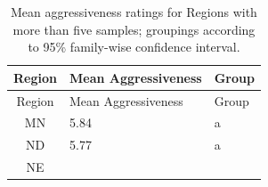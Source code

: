 \begin{longtable}[]{@{}cll@{}}
\caption{\label{tab:region-aggressiveness} Mean aggressiveness ratings for
Regions with more than five samples; groupings according to 95\%
family-wise confidence interval.}\tabularnewline
\toprule
\begin{minipage}[b]{0.14\columnwidth}\centering\strut
Region\strut
\end{minipage} & \begin{minipage}[b]{0.25\columnwidth}\raggedright\strut
Mean Aggressiveness\strut
\end{minipage} & \begin{minipage}[b]{0.08\columnwidth}\raggedright\strut
Group\strut
\end{minipage}\tabularnewline
\midrule
\endfirsthead
\toprule
\begin{minipage}[b]{0.14\columnwidth}\centering\strut
Region\strut
\end{minipage} & \begin{minipage}[b]{0.25\columnwidth}\raggedright\strut
Mean Aggressiveness\strut
\end{minipage} & \begin{minipage}[b]{0.08\columnwidth}\raggedright\strut
Group\strut
\end{minipage}\tabularnewline
\midrule
\endhead
\begin{minipage}[t]{0.14\columnwidth}\centering\strut
MN\strut
\end{minipage} & \begin{minipage}[t]{0.25\columnwidth}\raggedright\strut
5.84\strut
\end{minipage} & \begin{minipage}[t]{0.08\columnwidth}\raggedright\strut
a\strut
\end{minipage}\tabularnewline
\begin{minipage}[t]{0.14\columnwidth}\centering\strut
ND\strut
\end{minipage} & \begin{minipage}[t]{0.25\columnwidth}\raggedright\strut
5.77\strut
\end{minipage} & \begin{minipage}[t]{0.08\columnwidth}\raggedright\strut
a\strut
\end{minipage}\tabularnewline
\begin{minipage}[t]{0.14\columnwidth}\centering\strut
NE\strut
\end{minipage} & \begin{minipage}[t]{0.25\columnwidth}\raggedright\strut

\end{minipage}
\end{longtable}
